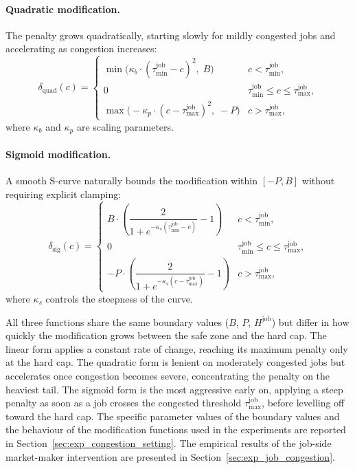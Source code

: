 \paragraph{Quadratic modification.}
The penalty grows quadratically, starting slowly for mildly congested jobs and
accelerating as congestion increases:
\begin{equation}
    \delta_{\text{quad}}(c) = \begin{cases}
        \min\!\bigl(\kappa_b \cdot (\tau_{\min}^{\text{job}} - c)^2,\; B\bigr) & c < \tau_{\min}^{\text{job}}, \\
        0 & \tau_{\min}^{\text{job}} \leq c \leq \tau_{\max}^{\text{job}}, \\
        \max\!\bigl(-\kappa_p \cdot (c - \tau_{\max}^{\text{job}})^2,\; -P\bigr) & c > \tau_{\max}^{\text{job}},
    \end{cases}
\end{equation}
where $\kappa_b$ and $\kappa_p$ are scaling parameters.

\paragraph{Sigmoid modification.}
A smooth S-curve naturally bounds the modification within $[-P, B]$ without
requiring explicit clamping:
\begin{equation}
    \delta_{\text{sig}}(c) = \begin{cases}
        B \cdot \!\left(\dfrac{2}{1 + e^{-\kappa_s(\tau_{\min}^{\text{job}} - c)}} - 1\right)
            & c < \tau_{\min}^{\text{job}}, \\[6pt]
        0 & \tau_{\min}^{\text{job}} \leq c \leq \tau_{\max}^{\text{job}}, \\[6pt]
        -P \cdot \!\left(\dfrac{2}{1 + e^{-\kappa_s(c - \tau_{\max}^{\text{job}})}} - 1\right)
            & c > \tau_{\max}^{\text{job}},
    \end{cases}
\end{equation}
where $\kappa_s$ controls the steepness of the curve.

All three functions share the same boundary values ($B$, $P$,
$H^{\text{job}}$) but differ in how quickly the modification grows
between the safe zone and the hard cap. The linear form applies a
constant rate of change, reaching its maximum penalty only at the hard
cap. The quadratic form is lenient on moderately congested jobs but
accelerates once congestion becomes severe, concentrating the penalty
on the heaviest tail. The sigmoid form is the most aggressive early
on, applying a steep penalty as soon as a job crosses the congested
threshold $\tau_{\max}^{\text{job}}$, before levelling off toward the hard cap. The specific parameter values of the boundary values and the behaviour of the modification functions used in the experiments are reported in Section~\ref{sec:exp_congestion_setting}. The empirical results of the job-side market-maker intervention are presented in Section~\ref{sec:exp_job_congestion}.
